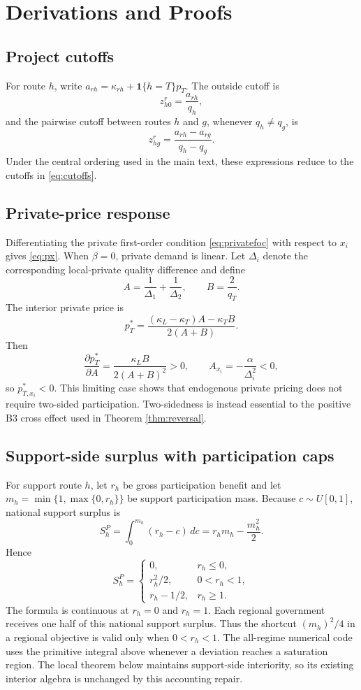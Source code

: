 \appendix
\section{Derivations and Proofs}\label{app:derivations}

\subsection{Project cutoffs}
For route $h$, write $a_{rh}=\kappa_{rh}+\mathbf 1\{h=T\}p_T$. The outside cutoff is
\[
z_{h0}^r=\frac{a_{rh}}{q_h},
\]
and the pairwise cutoff between routes $h$ and $g$, whenever $q_h\neq q_g$, is
\[
z_{hg}^r=\frac{a_{rh}-a_{rg}}{q_h-q_g}.
\]
Under the central ordering used in the main text, these expressions reduce to the cutoffs in \eqref{eq:cutoffs}.

\subsection{Private-price response}
Differentiating the private first-order condition \eqref{eq:privatefoc} with respect to $x_i$ gives \eqref{eq:px}. When $\beta=0$, private demand is linear. Let $\Delta_i$ denote the corresponding local-private quality difference and define
\[
A=\frac{1}{\Delta_1}+\frac{1}{\Delta_2},
\qquad
B=\frac{2}{q_T}.
\]
The interior private price is
\[
p_T^*
=\frac{(\kappa_L-\kappa_T)A-\kappa_TB}{2(A+B)}.
\]
Then
\[
\frac{\partial p_T^*}{\partial A}
=\frac{\kappa_LB}{2(A+B)^2}>0,
\qquad
A_{x_i}=-\frac{\alpha}{\Delta_i^2}<0,
\]
so $p_{T,x_i}^*<0$. This limiting case shows that endogenous private pricing does not require two-sided participation. Two-sidedness is instead essential to the positive B3 cross effect used in Theorem \ref{thm:reversal}.

\subsection{Support-side surplus with participation caps}\label{app:partnersurplus}
For support route $h$, let $r_h$ be gross participation benefit and let $m_h=\min\{1,\max\{0,r_h\}\}$ be support participation mass. Because $c\sim U[0,1]$, national support surplus is
\[
S_h^P=\int_0^{m_h}(r_h-c)\,dc=r_hm_h-\frac{m_h^2}{2}.
\]
Hence
\[
S_h^P=
\begin{cases}
0, & r_h\leq0,\\
r_h^2/2, & 0<r_h<1,\\
r_h-1/2, & r_h\geq1.
\end{cases}
\]
The formula is continuous at $r_h=0$ and $r_h=1$. Each regional government receives one half of this national support surplus. Thus the shortcut $(m_h)^2/4$ in a regional objective is valid only when $0<r_h<1$. The all-regime numerical code uses the primitive integral above whenever a deviation reaches a saturation region. The local theorem below maintains support-side interiority, so its existing interior algebra is unchanged by this accounting repair.

